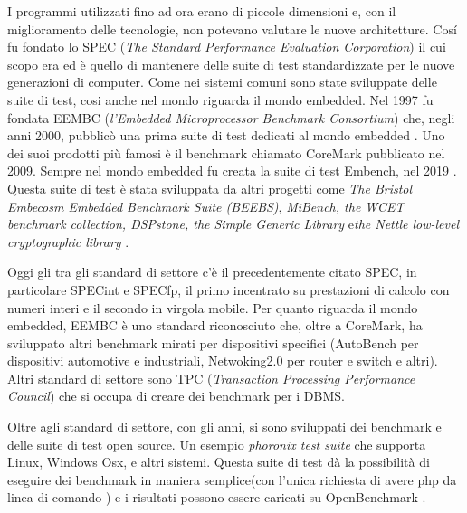 \documentclass[12pt, a4paper]{report}
\begin{document}
 I programmi utilizzati fino ad ora erano di piccole dimensioni e, con il miglioramento delle tecnologie, non potevano valutare le nuove architetture. Cos\'i fu fondato lo SPEC (\textit{The Standard Performance Evaluation Corporation}) il cui scopo era ed è quello di mantenere delle suite di test standardizzate per le nuove generazioni di computer. 
 Come nei sistemi comuni sono state sviluppate delle suite di test, cosi anche nel mondo riguarda il mondo embedded. Nel 1997 fu fondata EEMBC (\textit{l'Embedded Microprocessor Benchmark Consortium}) che, negli anni 2000, pubblicò una prima suite di test dedicati al mondo embedded \cite{EEMBCSite}. %
 Uno dei suoi prodotti più famosi è il benchmark chiamato CoreMark pubblicato nel 2009. %
 Sempre nel mondo embedded fu creata la suite di test Embench, nel 2019 \cite{embenchSite}. Questa suite di test è stata sviluppata da altri progetti come \textit{The Bristol Embecosm Embedded Benchmark Suite (BEEBS)}, \textit{MiBench, the WCET benchmark collection, DSPstone, the Simple Generic Library} e\textit{the Nettle low-level cryptographic library}\cite{NettleSite}\cite{vittekBorovanskyMoreauTurin2006, }\cite{DSPStoneSite} \cite{WCETSite} \cite{MiBenchSite}. %
 
 Oggi gli tra gli standard di settore c'è il precedentemente citato SPEC, in particolare SPECint e SPECfp, il primo incentrato su prestazioni di calcolo con numeri interi e il secondo in virgola mobile. 
 Per quanto riguarda il mondo embedded, EEMBC è uno standard riconosciuto che, oltre a CoreMark, ha sviluppato altri benchmark mirati per dispositivi specifici (AutoBench per dispositivi automotive e industriali, Netwoking2.0 per router e switch e altri). %
 Altri standard di settore sono TPC (\textit{Transaction Processing Performance Council}) che si occupa di creare dei benchmark per i DBMS\cite{TPCSite}. %

 Oltre agli standard di settore, con gli anni, si sono sviluppati dei benchmark e delle suite di test open source. Un esempio \textit{phoronix test suite} \cite{ PhoronixTestSuiteSite}
 che supporta Linux, Windows Osx, e altri sistemi. Questa suite di test dà la possibilità di eseguire dei benchmark in maniera semplice(con l'unica richiesta di avere php da linea di comando ) e i risultati possono essere caricati su OpenBenchmark \cite{OpenBenchmarkSite}.
\end{document}
